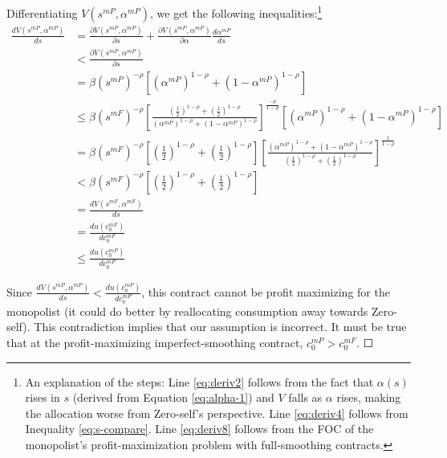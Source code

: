 \documentclass[11pt,english]{article}
\theoremstyle{plain}
\theoremstyle{definition}
\begin{document}
Differentiating $V\left(s^{mP},\alpha^{mP}\right)$, we get the following
inequalities:\footnote{An explanation of the steps: Line \ref{eq:deriv2} follows from the
fact that $\alpha\left(s\right)$ rises in $s$ (derived from Equation
\ref{eq:alpha-1}) and $V$ falls as $\alpha$ rises, making the allocation
worse from Zero-self's perspective. Line \ref{eq:deriv4} follows
from Inequality \ref{eq:s-compare}. Line \ref{eq:deriv8} follows
from the FOC of the monopolist's profit-maximization problem with
full-smoothing contracts. } 
\begin{align}
\frac{dV\left(s^{mP},\alpha^{mP}\right)}{ds} & =\frac{\partial V\left(s^{mP},\alpha^{mP}\right)}{\partial s}+\frac{\partial V\left(s^{mP},\alpha^{mP}\right)}{\partial\alpha}\frac{d\alpha^{mP}}{ds}\label{eq:deriv1}\\
 & <\frac{\partial V\left(s^{mP},\alpha^{mP}\right)}{\partial s}\label{eq:deriv2}\\
 & =\beta\left(s^{mP}\right)^{-\rho}\left[\left(\alpha^{mP}\right)^{1-\rho}+\left(1-\alpha^{mP}\right)^{1-\rho}\right]\label{eq:deriv3}\\
 & \leq\beta\left(s^{mF}\right)^{-\rho}\left[\frac{\left(\frac{1}{2}\right)^{1-\rho}+\left(\frac{1}{2}\right)^{1-\rho}}{\left(\alpha^{mP}\right)^{1-\rho}+\left(1-\alpha^{mP}\right)^{1-\rho}}\right]^{\frac{-\rho}{1-\rho}}\left[\left(\alpha^{mP}\right)^{1-\rho}+\left(1-\alpha^{mP}\right)^{1-\rho}\right]\label{eq:deriv4}\\
 & =\beta\left(s^{mF}\right)^{-\rho}\left[\left(\frac{1}{2}\right)^{1-\rho}+\left(\frac{1}{2}\right)^{1-\rho}\right]\left[\frac{\left(\alpha^{mP}\right)^{1-\rho}+\left(1-\alpha^{mP}\right)^{1-\rho}}{\left(\frac{1}{2}\right)^{1-\rho}+\left(\frac{1}{2}\right)^{1-\rho}}\right]^{\frac{1}{1-\rho}}\label{eq:deriv5}\\
 & <\beta\left(s^{mF}\right)^{-\rho}\left[\left(\frac{1}{2}\right)^{1-\rho}+\left(\frac{1}{2}\right)^{1-\rho}\right]\label{eq:deriv6}\\
 & =\frac{dV\left(s^{mF},\alpha^{mF}\right)}{ds}\label{eq:deriv7}\\
 & =\frac{du\left(c_{0}^{mF}\right)}{dc_{0}^{mF}}\label{eq:deriv8}\\
 & \leq\frac{du\left(c_{0}^{mP}\right)}{dc_{0}^{mP}}\label{eq:deriv9}
\end{align}

Since $\frac{dV\left(s^{mP},\alpha^{mP}\right)}{ds}<\frac{du\left(c_{0}^{mP}\right)}{dc_{0}^{mP}}$,
this contract cannot be profit maximizing for the monopolist (it could
do better by reallocating consumption away towards Zero-self). This
contradiction implies that our assumption is incorrect. It must be
true that at the profit-maximizing imperfect-smoothing contract, $c_{0}^{mP}>c_{0}^{mF}$.
$\Square$
\end{document}
